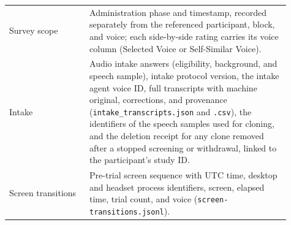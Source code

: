 \begin{longtable}{@{}p{0.26\linewidth}p{0.65\linewidth}@{}}
Survey scope & Administration phase and timestamp, recorded separately from the referenced participant, block, and voice; each side-by-side rating carries its voice column (Selected Voice or Self-Similar Voice).\\
Intake & Audio intake answers (eligibility, background, and speech sample), intake protocol version, the intake agent voice ID, full transcripts with machine original, corrections, and provenance (\texttt{intake\_transcripts.json} and \texttt{.csv}), the identifiers of the speech samples used for cloning, and the deletion receipt for any clone removed after a stopped screening or withdrawal, linked to the participant's study ID.\\
Screen transitions & Pre-trial screen sequence with UTC time, desktop and headset process identifiers, screen, elapsed time, trial count, and voice (\texttt{screen-transitions.jsonl}).\\\bottomrule
\end{longtable}
\endgroup

